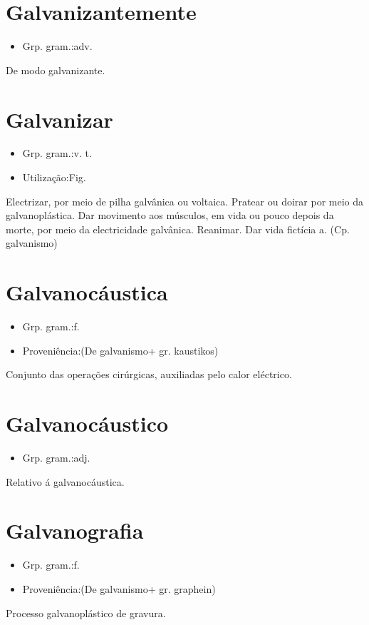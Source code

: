 \section{Galvanizantemente}
\begin{itemize}
\item {Grp. gram.:adv.}
\end{itemize}
De modo galvanizante.
\section{Galvanizar}
\begin{itemize}
\item {Grp. gram.:v. t.}
\end{itemize}
\begin{itemize}
\item {Utilização:Fig.}
\end{itemize}
Electrizar, por meio de pilha galvânica ou voltaica.
Pratear ou doirar por meio da galvanoplástica.
Dar movimento aos músculos, em vida ou pouco depois da morte, por meio da electricidade galvânica.
Reanimar.
Dar vida fictícia a.
(Cp. \textunderscore galvanismo\textunderscore )
\section{Galvanocáustica}
\begin{itemize}
\item {Grp. gram.:f.}
\end{itemize}
\begin{itemize}
\item {Proveniência:(De \textunderscore galvanismo\textunderscore  + gr. \textunderscore kaustikos\textunderscore )}
\end{itemize}
Conjunto das operações cirúrgicas, auxiliadas pelo calor eléctrico.
\section{Galvanocáustico}
\begin{itemize}
\item {Grp. gram.:adj.}
\end{itemize}
Relativo á galvanocáustica.
\section{Galvanografia}
\begin{itemize}
\item {Grp. gram.:f.}
\end{itemize}
\begin{itemize}
\item {Proveniência:(De \textunderscore galvanismo\textunderscore  + gr. \textunderscore graphein\textunderscore )}
\end{itemize}
Processo galvanoplástico de gravura.
